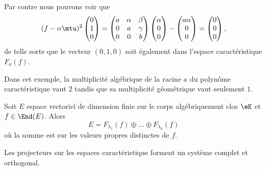 \begin{remark}
    Par contre nous pouvons voir que
    \begin{equation}
        (f-\alpha\mtu)^2\begin{pmatrix}
             0   \\ 
            1    \\ 
            0    
        \end{pmatrix}=
        \begin{pmatrix}
            a    &   \alpha    &   \beta    \\
            0    &   a    &   \gamma    \\
            0    &   0    &   b
        \end{pmatrix}
        \begin{pmatrix}
            \alpha    \\ 
            0    \\ 
            0    
        \end{pmatrix}-\begin{pmatrix}
            a\alpha    \\ 
            0    \\ 
            0    
        \end{pmatrix}=\begin{pmatrix}
            0    \\ 
            0    \\ 
            0    
        \end{pmatrix},
    \end{equation}
    de telle sorte que le vecteur \( (0,1,0)\) soit également dans l'espace caractéristique \( F_a(f)\).

    Dans cet exemple, la multiplicité algébrique de la racine \( a\) du polynôme caractéristique vaut \( 2\) tandis que sa multiplicité géométrique vaut seulement \( 1\).
\end{remark}

\begin{theorem}     \label{ThoSpectraluRMLok}
    Soit \( E\) espace vectoriel de dimension finie sur le corps algébriquement clos \( \eK\) et \( f\in\End(E)\). Alors
    \begin{equation}
        E=F_{\lambda_1}(f)\oplus\ldots\oplus F_{\lambda_k}(f)
    \end{equation}
    où la somme est sur les valeurs propres distinctes de \( f\).

    Les projecteurs sur les espaces caractéristique forment un système complet et orthogonal.
\end{theorem}

